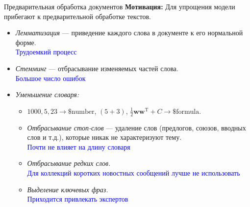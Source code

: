 \documentclass[unicode,9pt, pdf]{beamer}
\begin{document}
     
   \begin{frame}{Предварительная обработка документов}
   \textbf{Мотивация:} Для упрощения модели прибегают к предварительной обработке текстов.
   
   \begin{itemize}
       \item \textit{Лемматизация} --- приведение каждого слова в документе к его нормальной форме.\\
       \vspace{0.1 cm}
       \textcolor{blue}{Трудоемкий процесс}
       \vspace{0.1 cm}  
       \item \textit{Стемминг} --- отбрасывание изменяемых частей слова.\\
    \vspace{0.1 cm}
       \textcolor{blue}{Большое число ошибок}
       \vspace{0.1 cm}      
       \item \textit{Уменьшение словаря:}\\
       \vspace{0.1 cm}
       \begin{itemize}
           \item $1000, 5, 23 \to \text{\$number}$,
           \vspace{0.2 cm}
           $(5+3)$, $\frac{1}{2}\mathbf{w}\mathbf{w}^{\mathrm{T}} + C \to \text{\$formula}$.
           \vspace{0.1 cm} 
           \item \textit{Отбрасывание стоп-слов} --- удаление слов (предлогов, союзов, вводных слов и т.д.), которые никак не характеризуют тему.\\
           \textcolor{blue}{Почти не влияет на длину словаря}
            \vspace{0.1 cm} 
           \item \textit{Отбрасывание редких слов.}\\
          \textcolor{blue}{Для коллекций коротких новостных сообщений лучше не использовать}
           \vspace{0.1 cm} 
           \item \textit{Выделение ключевых фраз.}\\
             \textcolor{blue}{Приходится привлекать экспертов}
       \end{itemize} 
   \end{itemize}

   \end{frame}
   
\end{document}
